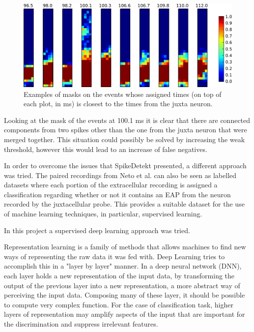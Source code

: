 \documentclass[10pt]{article}
\begin{document}
\begin{figure}[!h]
	\centering
	\includegraphics[width=\linewidth]{2.Chapter/masks-939-ready-summary.pdf}
	\caption{Examples of masks on the events whose assigned times (on top of each plot, in ms) is closest to the times from the juxta neuron.
}
\label{fig:masks-examples}
\end{figure}


Looking at the mask of the events at 100.1 ms it is clear that there are connected components from two spikes other than the one from the juxta neuron that were merged together. This situation could possibly be solved by increasing the weak threshold, however this would lead to an increase of false negatives. 


In order to overcome the issues that SpikeDetekt presented, a different approach was tried. The paired recordings from Neto et al. can also be seen as labelled datasets where each portion of the extracellular recording is assigned a classification regarding whether or not it contains an EAP from the neuron recorded by the juxtacellular probe. This provides a suitable dataset for the use of machine learning techniques, in particular, supervised learning. 

In this project a supervised deep learning approach was tried.

Representation learning is a family of methods that allows machines to find new ways of representing the raw data it was fed with. Deep Learning tries to accomplish this in a "layer by layer" manner. In a deep neural network (DNN), each layer holds a new representation of the input data, by transforming the output of the previous layer into a new representation, a more abstract way of perceiving the input data. Composing many of these layer, it should be possible to compute very complex function. For the case of classification task, higher layers of representation may amplify aspects of the input that are important for the discrimination and suppress irrelevant features. \cite{lecun2015deep}
\end{document}
